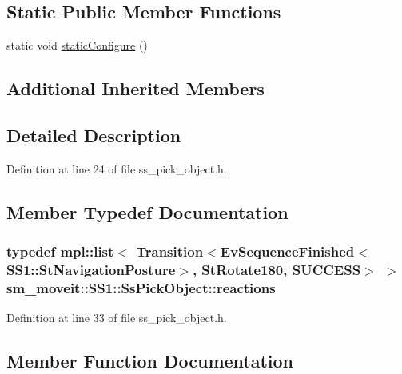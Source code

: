 \subsection*{Static Public Member Functions}
\begin{DoxyCompactItemize}
\item 
static void \hyperlink{structsm__moveit_1_1SS1_1_1SsPickObject_ab589ae81913b79dda9f94d03e5b0fa86}{static\+Configure} ()
\end{DoxyCompactItemize}
\subsection*{Additional Inherited Members}


\subsection{Detailed Description}


Definition at line 24 of file ss\+\_\+pick\+\_\+object.\+h.



\subsection{Member Typedef Documentation}
\subsubsection[{\texorpdfstring{reactions}{reactions}}]{\setlength{\rightskip}{0pt plus 5cm}typedef mpl\+::list$<$ Transition$<$Ev\+Sequence\+Finished$<$S\+S1\+::\+St\+Navigation\+Posture$>$, {\bf St\+Rotate180}, {\bf S\+U\+C\+C\+E\+SS}$>$ $>$ {\bf sm\+\_\+moveit\+::\+S\+S1\+::\+Ss\+Pick\+Object\+::reactions}}\hypertarget{structsm__moveit_1_1SS1_1_1SsPickObject_a6fe2bd5b7184fd5ee2f5def21cc4423e}{}\label{structsm__moveit_1_1SS1_1_1SsPickObject_a6fe2bd5b7184fd5ee2f5def21cc4423e}


Definition at line 33 of file ss\+\_\+pick\+\_\+object.\+h.



\subsection{Member Function Documentation}
